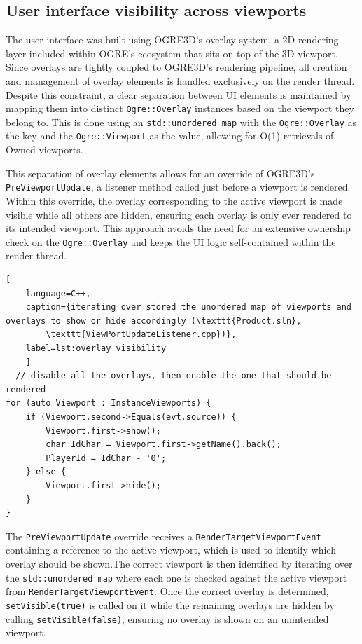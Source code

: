\documentclass[]{final_report}
\begin{document}
\subsection{User interface visibility across viewports}
The user interface was built using OGRE3D's overlay system, a 2D rendering layer included within OGRE's ecosystem that sits on top of the 3D viewport. Since overlays are tightly coupled to OGRE3D's rendering pipeline, all creation and management of overlay elements is handled exclusively on the render thread. Despite this constraint, a clear separation between UI elements is maintained by mapping them into distinct \texttt{Ogre::Overlay} instances based on the viewport they belong to. This is done using an \texttt{std::unordered map} with the \texttt{Ogre::Overlay} as the key and the \texttt{Ogre::Viewport} as the value, allowing for O(1) retrievals of Owned viewports.

This separation of overlay elements allows for an override of OGRE3D's \texttt{PreViewportUpdate}, a listener method called just before a viewport is rendered. Within this override, the overlay corresponding to the active viewport is made visible while all others are hidden, ensuring each overlay is only ever rendered to its intended viewport. This approach avoids the need for an extensive ownership check on the \texttt{Ogre::Overlay} and keeps the UI logic self-contained within the render thread. 

\begin{lstlisting}[
	language=C++,
	caption={iterating over stored the unordered map of viewports and overlays to show or hide accordingly (\texttt{Product.sln}, 
		\texttt{ViewPortUpdateListener.cpp})},
	label=lst:overlay visibility
	]
  // disable all the overlays, then enable the one that should be rendered
for (auto Viewport : InstanceViewports) {
	if (Viewport.second->Equals(evt.source)) {
		Viewport.first->show();
		char IdChar = Viewport.first->getName().back();
		PlayerId = IdChar - '0';
	} else {
		Viewport.first->hide();
	}
}
\end{lstlisting}
The \texttt{PreViewportUpdate} override receives a \texttt{RenderTargetViewportEvent} containing a reference to the active viewport, which is used to identify which overlay should be shown.The correct viewport is then identified by iterating over the \texttt{std::unordered map} where each one is checked against the active viewport from \texttt{RenderTargetViewportEvent}. Once the correct overlay is determined, \texttt{setVisible(true)} is called on it while the remaining overlays are hidden by calling \texttt{setVisible(false)}, ensuring no overlay is shown on an unintended viewport.
\end{document}
